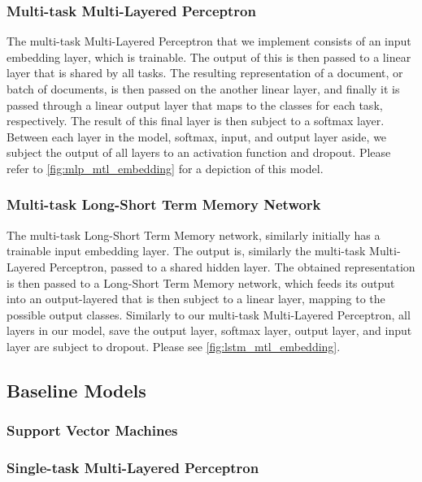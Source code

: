 \subsubsection{Multi-task Multi-Layered Perceptron}

The multi-task Multi-Layered Perceptron that we implement consists of an input embedding layer, which is trainable. The output of this is then passed to a linear layer that is shared by all tasks. The resulting representation of a document, or batch of documents, is then passed on the another linear layer, and finally it is passed through a linear output layer that maps to the classes for each task, respectively. The result of this final layer is then subject to a softmax layer. Between each layer in the model, softmax, input, and output layer aside, we subject the output of all layers to an activation function and dropout. Please refer to \autoref{fig:mlp_mtl_embedding} for a depiction of this model.

\subsubsection{Multi-task Long-Short Term Memory Network}

The multi-task Long-Short Term Memory network, similarly initially has a trainable input embedding layer. The output is, similarly the multi-task Multi-Layered Perceptron, passed to a shared hidden layer. The obtained representation is then passed to a Long-Short Term Memory network, which feeds its output into an output-layered that is then subject to a linear layer, mapping to the possible output classes. Similarly to our multi-task Multi-Layered Perceptron, all layers in our model, save the output layer, softmax layer, output layer, and input layer are subject to dropout. Please see \autoref{fig:lstm_mtl_embedding}.

\subsection{Baseline Models}


\subsubsection{Support Vector Machines}

\subsubsection{Single-task Multi-Layered Perceptron}

